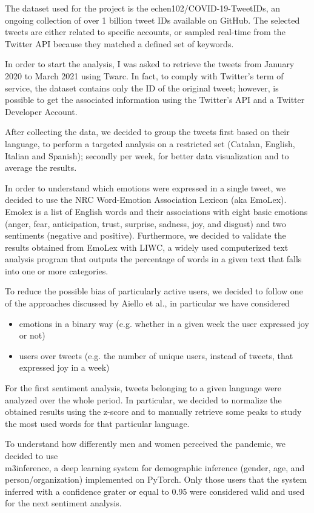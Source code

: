 The dataset used for the project is the echen102/COVID-19-TweetIDs, an ongoing collection of over 1 billion tweet IDs available on GitHub. The selected tweets are either related to specific accounts, or sampled real-time from the Twitter API because they matched a defined set of keywords.

In order to start the analysis, I was asked to retrieve the tweets from January 2020 to March 2021 using Twarc. In fact, to comply with Twitter's term of service, the dataset contains only the ID of the original tweet; however, is possible to get the associated information using the Twitter's API and a Twitter Developer Account.

After collecting the data, we decided to group the tweets first based on their language, to perform a targeted analysis on a restricted set (Catalan, English, Italian and Spanish); secondly per week, for better data visualization and to average the results.

In order to understand which emotions were expressed in a single tweet, we decided to use the NRC Word-Emotion Association Lexicon (aka EmoLex). Emolex is a list of English words and their associations with eight basic emotions (anger, fear, anticipation, trust, surprise, sadness, joy, and disgust) and two sentiments (negative and positive). Furthermore, we decided to validate the results obtained from EmoLex with LIWC, a widely used computerized text analysis program that outputs the percentage of words in a given text that falls into one or more categories.

To reduce the possible bias of particularly active users, we decided to follow one of the approaches discussed by Aiello et al., in particular we have considered
	
\begin{itemize}
	\item emotions in a binary way (e.g. whether in a given week the user expressed joy or not)
	\item users over tweets (e.g. the number of unique users, instead of tweets, that expressed joy in a week)
\end{itemize}

For the first sentiment analysis, tweets belonging to a given language were analyzed over the whole period. In particular, we decided to normalize the obtained results using the z-score and to manually retrieve some peaks to study the most used words for that particular language.

To understand how differently men and women perceived the pandemic, we decided to use\\ m3inference, a deep learning system for demographic inference (gender, age, and person/organization) implemented on PyTorch. Only those users that the system inferred with a confidence grater or equal to 0.95 were considered valid and used for the next sentiment analysis.

